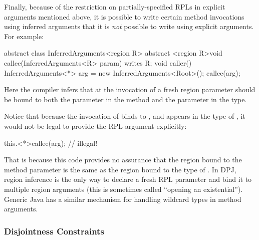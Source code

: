 Finally, because of the restriction on partially-specified RPLs in
explicit arguments mentioned above, it is possible to write certain
method invocations using inferred arguments that it is \emph{not}
possible to write using explicit arguments.  For example:
%
\begin{dpjlisting}
abstract class InferredArguments<region R> {
    abstract <region R>void callee(InferredArguments<R> param) writes R;
    void caller() {
        InferredArguments<*> arg = new InferredArguments<Root>();
        callee(arg);
    }
}
\end{dpjlisting}
%
Here the compiler infers that at the invocation of  a
fresh region parameter should be bound to both the parameter 
in the method and the parameter  in the type.

Notice that because the invocation of  binds \kwd{*} to
, and  appears in the type of , it would not
be legal to provide the RPL argument explicitly:
%
\begin{dpjlisting}
this.<*>callee(arg); // illegal!
\end{dpjlisting}
%
That is because this code provides no assurance that the region bound
to the method parameter is the same as the region bound to the type of
.  In DPJ, region inference is the only way to declare a
fresh RPL parameter and bind it to multiple region arguments (this is
sometimes called ``opening an existential'').  Generic Java has a
similar mechanism for handling wildcard types in method arguments.

\subsubsection{Disjointness Constraints%
\label{sec:classes:params:disjoint}}

